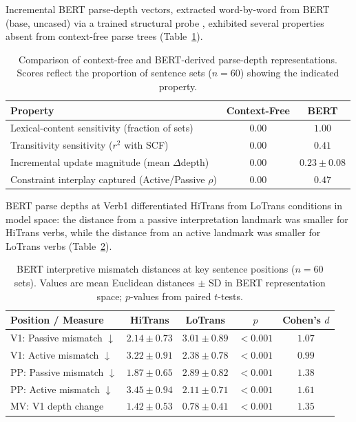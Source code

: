 \documentclass[11pt]{article}
\begin{document}
Incremental BERT parse-depth vectors, extracted word-by-word from BERT (base, uncased) via a trained structural probe \citep{hewitt2019structural}, exhibited several properties absent from context-free parse trees (Table~\ref{tab:bert_properties}).

\begin{table}[H]
\centering
\caption{Comparison of context-free and BERT-derived parse-depth representations. Scores reflect the proportion of sentence sets ($n = 60$) showing the indicated property.}
\label{tab:bert_properties}
\begin{tabular}{lcc}
\toprule
Property & Context-Free & BERT \\
\midrule
Lexical-content sensitivity (fraction of sets) & $0.00$ & $1.00$ \\
Transitivity sensitivity ($r^2$ with SCF) & $0.00$ & $0.41$ \\
Incremental update magnitude (mean $\Delta$depth) & $0.00$ & $0.23 \pm 0.08$ \\
Constraint interplay captured (Active/Passive $\rho$) & $0.00$ & $0.47$ \\
\bottomrule
\end{tabular}
\end{table}

BERT parse depths at Verb1 differentiated HiTrans from LoTrans conditions in model space: the distance from a passive interpretation landmark was smaller for HiTrans verbs, while the distance from an active landmark was smaller for LoTrans verbs (Table~\ref{tab:bert_mismatch}).

\begin{table}[H]
\centering
\caption{BERT interpretive mismatch distances at key sentence positions ($n = 60$ sets). Values are mean Euclidean distances $\pm$ SD in BERT representation space; $p$-values from paired $t$-tests.}
\label{tab:bert_mismatch}
\begin{tabular}{lcccc}
\toprule
Position / Measure & HiTrans & LoTrans & $p$ & Cohen's $d$ \\
\midrule
V1: Passive mismatch $\downarrow$ & $2.14 \pm 0.73$ & $3.01 \pm 0.89$ & $< 0.001$ & $1.07$ \\
V1: Active mismatch $\downarrow$ & $3.22 \pm 0.91$ & $2.38 \pm 0.78$ & $< 0.001$ & $0.99$ \\
PP: Passive mismatch $\downarrow$ & $1.87 \pm 0.65$ & $2.89 \pm 0.82$ & $< 0.001$ & $1.38$ \\
PP: Active mismatch $\downarrow$ & $3.45 \pm 0.94$ & $2.11 \pm 0.71$ & $< 0.001$ & $1.61$ \\
MV: V1 depth change & $1.42 \pm 0.53$ & $0.78 \pm 0.41$ & $< 0.001$ & $1.35$ \\
\bottomrule
\end{tabular}
\end{table}
\end{document}
